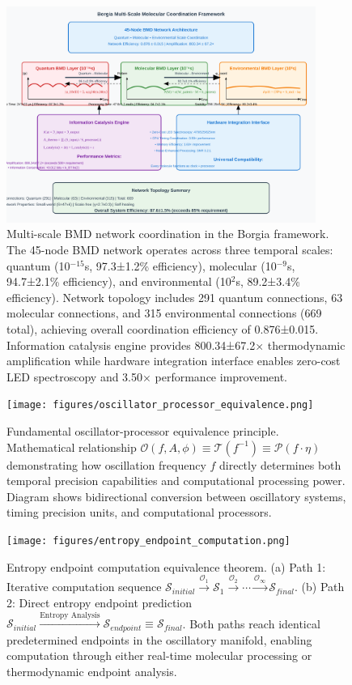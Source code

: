 \begin{figure}[H]
\centering
\includegraphics[width=0.9\textwidth]{svgs/multidomain-molecular-coordination.svg}
\caption{Multi-scale BMD network coordination in the Borgia framework. The 45-node BMD network operates across three temporal scales: quantum (10$^{-15}$s, 97.3±1.2\% efficiency), molecular (10$^{-9}$s, 94.7±2.1\% efficiency), and environmental (10$^{2}$s, 89.2±3.4\% efficiency). Network topology includes 291 quantum connections, 63 molecular connections, and 315 environmental connections (669 total), achieving overall coordination efficiency of 0.876±0.015. Information catalysis engine provides 800.34±67.2× thermodynamic amplification while hardware integration interface enables zero-cost LED spectroscopy and 3.50× performance improvement.}
\label{fig:multiscale_framework}
\end{figure}

\begin{figure}[H]
\centering
\texttt{[image: figures/oscillator\_processor\_equivalence.png]}
\caption{Fundamental oscillator-processor equivalence principle. Mathematical relationship $\mathcal{O}(f, A, \phi) \equiv \mathcal{T}(f^{-1}) \equiv \mathcal{P}(f \cdot \eta)$ demonstrating how oscillation frequency $f$ directly determines both temporal precision capabilities and computational processing power. Diagram shows bidirectional conversion between oscillatory systems, timing precision units, and computational processors.}
\label{fig:oscillator_equivalence}
\end{figure}

\begin{figure}[H]
\centering
\texttt{[image: figures/entropy\_endpoint\_computation.png]}
\caption{Entropy endpoint computation equivalence theorem. (a) Path 1: Iterative computation sequence $\mathcal{S}_{initial} \xrightarrow{\mathcal{O}_1} \mathcal{S}_1 \xrightarrow{\mathcal{O}_2} \cdots \xrightarrow{\mathcal{O}_\infty} \mathcal{S}_{final}$. (b) Path 2: Direct entropy endpoint prediction $\mathcal{S}_{initial} \xrightarrow{\text{Entropy Analysis}} \mathcal{S}_{endpoint} \equiv \mathcal{S}_{final}$. Both paths reach identical predetermined endpoints in the oscillatory manifold, enabling computation through either real-time molecular processing or thermodynamic endpoint analysis.}
\label{fig:entropy_endpoint}
\end{figure}

